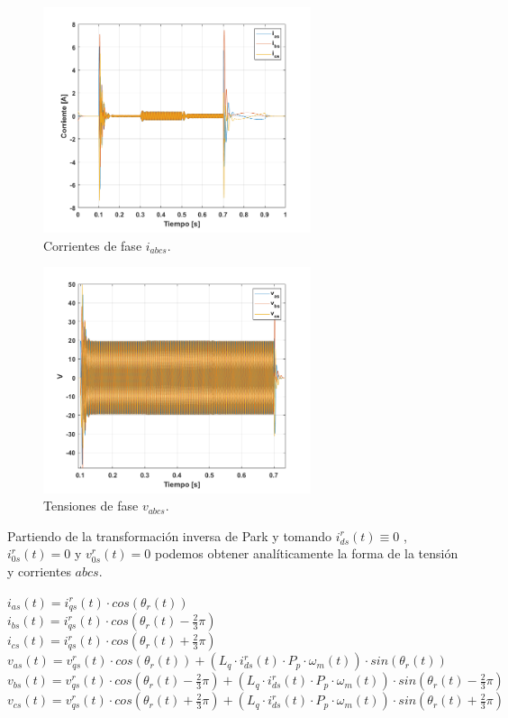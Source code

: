 \documentclass[10pt]{article}
\begin{document}
\begin{itemize}
	\begin{figure}[h!]
	\centering
	\includegraphics[width=0.7\textwidth]{corriente.png}
	\caption{\label{fig:corriente} Corrientes de fase $i_{abcs}$.}
	\end{figure}
	\begin{figure}[h!]
	\centering
	\includegraphics[width=0.7\textwidth]{v.png}
	\caption{\label{fig:v} Tensiones de fase $v_{abcs}$.}
	\end{figure}
	\newpage
	Partiendo de la transformación inversa de Park y tomando $i^{r}_{ds}(t) \equiv 0$ , $i^{r}_{0s}(t)=0$ y $v^{r}_{0s}(t)=0$ podemos obtener analíticamente la forma de la tensión y corrientes $abcs$.
	
	$i_{as}(t)=i^{r}_{qs}(t)\cdot cos(\theta_{r}(t))$\\
	$i_{bs}(t)=i^{r}_{qs}(t)\cdot cos(\theta_{r}(t)-\frac{2}{3}\pi)$\\
	$i_{cs}(t)=i^{r}_{qs}(t)\cdot cos(\theta_{r}(t)+\frac{2}{3}\pi)$\\
	$v_{as}(t)=v^{r}_{qs}(t)\cdot cos(\theta_{r}(t)) + (L_q\cdot i_{ds}^{r}(t)\cdot P_p \cdot \omega_m(t))\cdot sin(\theta_{r}(t))$\\
	$v_{bs}(t)=v^{r}_{qs}(t)\cdot cos(\theta_{r}(t)-\frac{2}{3}\pi) + (L_q\cdot i_{ds}^{r}(t)\cdot P_p \cdot \omega_m(t))\cdot sin(\theta_{r}(t)-\frac{2}{3}\pi)$\\
	$v_{cs}(t)=v^{r}_{qs}(t)\cdot cos(\theta_{r}(t)+\frac{2}{3}\pi) + (L_q\cdot i_{ds}^{r}(t)\cdot P_p \cdot \omega_m(t))\cdot sin(\theta_{r}(t)+\frac{2}{3}\pi)$\\
	

\end{itemize}
\end{document}
